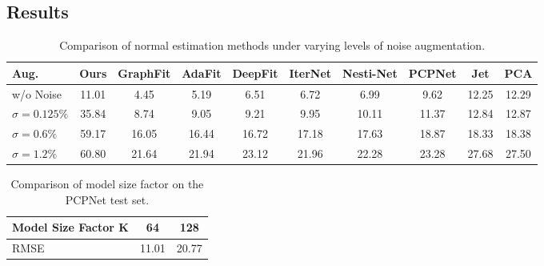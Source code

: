 \documentclass{acmart}
\newcommand{\instructions}[1]{\textcolor{red}{#1}\newline}
\renewcommand{\instructions}[1]{}    %
\begin{document}
 \subsection{Results}
 \instructions{Discuss in details the results of your experiments. Did you succeed? what is the improvement \% ? provide cumulative analysis of the results. Discuss potential error, or suggest explanations to why the method failed if it failed - 
 1 page}

 \begin{table}[ht]
  \centering
  \caption{Comparison of normal estimation methods under varying levels of noise augmentation.}
  \label{tab:noise_comparison}
  \begin{tabular}{lccccccccc}
  \hline
  \textbf{Aug.} & \textbf{Ours} & \textbf{GraphFit} & \textbf{AdaFit} & \textbf{DeepFit} & \textbf{IterNet} & \textbf{Nesti-Net} & \textbf{PCPNet} & \textbf{Jet} & \textbf{PCA} \\ \hline
  w/o Noise & 11.01 & 4.45  & 5.19  & 6.51  & 6.72  & 6.99  & 9.62  & 12.25 & 12.29 \\
  $\sigma = 0.125\%$ & 35.84 & 8.74  & 9.05  & 9.21  & 9.95  & 10.11 & 11.37 & 12.84 & 12.87 \\
  $\sigma = 0.6\%$  & 59.17 & 16.05 & 16.44 & 16.72 & 17.18 & 17.63 & 18.87 & 18.33 & 18.38 \\
  $\sigma = 1.2\%$  & 60.80 & 21.64 & 21.94 & 23.12 & 21.96 & 22.28 & 23.28 & 27.68 & 27.50 \\ \hline
  \end{tabular}
  \end{table}

\begin{table}[ht]
  \centering
  \caption{Comparison of model size factor on the PCPNet test set.}
  \label{tab:size_comparison}
  \begin{tabular}{lcc}
  \hline
  \textbf{Model Size Factor K} & \textbf{64} & \textbf{128} \\ \hline
  RMSE & 11.01 & 20.77 \\ \hline
  \end{tabular}
  \end{table}
\end{document}

